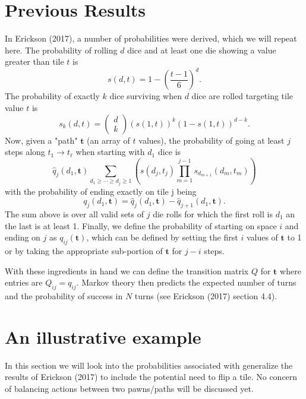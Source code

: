 \documentclass[letterpaper]{article}
\begin{document}
\section{Previous Results}
In Erickson (2017), a number of probabilities were derived, which we will
repeat here.  The probability of rolling $d$ dice and at least one die showing
a value greater than tile $t$ is
\begin{equation}
	s\left(d,t\right) = 1-\left(\frac{t-1}{6}\right)^d.
\end{equation}
The probability of exactly $k$ dice surviving when $d$ dice are rolled targeting
tile value $t$ is
\begin{equation}
	s_k\left(d,t\right)=\left(
	\begin{array}{c}
		d \\
		k
	\end{array} \right) \left(s\left(1,t\right)\right)^k
	\left(1-s\left(1,t\right)\right)^{d-k}.
\end{equation}
Now, given a "path" $\mathbf{t}$ (an array of $t$ values), the probability of
going at least $j$ steps along $t_1 \rightarrow t_\ell$ when starting with
$d_1$ dice is
\begin{equation}
	\hat{q}_j\left(d_1,\mathbf{t}\right) \sum_{d_1\geq\cdots\geq d_j\geq 1}
	\left( s\left(d_j,t_j\right)
	\prod_{m=1}^{j-1} s_{d_{m+1}}\left(d_m,t_m\right)\right)
\end{equation}
with the probability of ending exactly on tile j being
\begin{equation}
	q_j\left(d_1,\mathbf{t}\right)= \hat{q}_j\left(d_1,\mathbf{t}\right) -
	\hat{q}_{j+1}\left(d_1,\mathbf{t}\right).
\end{equation}
The sum above is over all valid sets of $j$ die rolls for which the first roll
is $d_1$ an the last is at least 1.  Finally, we define the probability of
starting on space $i$ and ending on $j$ as $q_{ij}(\mathbf{t})$, which can be
defined by setting the first $i$ values of $\mathbf{t}$ to 1 or by taking the
appropriate sub-portion of $\mathbf{t}$ for $j-i$ steps.

With these ingredients in hand we can define the transition matrix $Q$ for
$\mathbf{t}$ where entries are $Q_{ij}=q_{ij}$.  Markov theory then predicts
the expected number of turns and the probability of success in $N$ turns (see
Erickson (2017) section 4.4).  

\section{An illustrative example}
In this section we will look into the probabilities associated with  generalize the results of Erickson (2017) to include
the potential need to flip a tile.  No concern of balancing actions between two
pawns/paths will be discussed yet.
\end{document}
